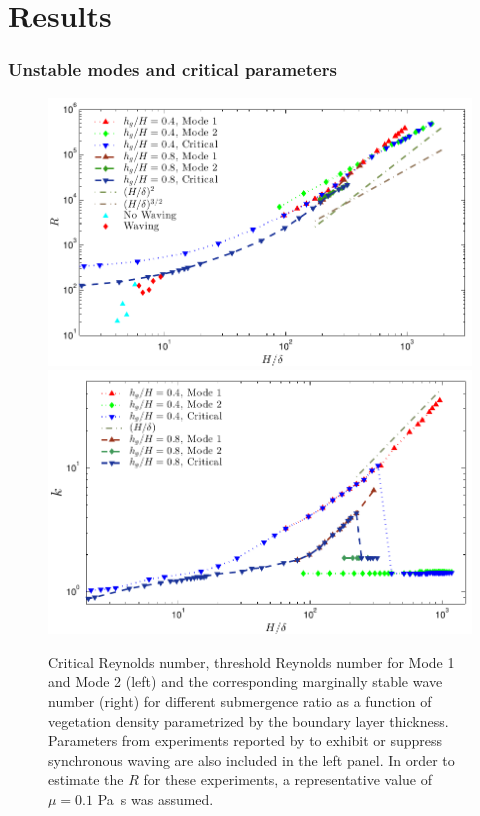 \documentclass[12pt]{report}   %
\newcommand{\Rey}{{R}}
\begin{document}
\chapter{Results}
\subsection{Unstable modes and critical parameters}
\begin{figure}
\begin{center}
\includegraphics[scale = 0.95]{new_graph_R_vs_delta}\\
\includegraphics[scale = 0.95]{new_graph_K_vs_delta}
\end{center}
\caption{
Critical Reynolds number, threshold Reynolds number for Mode 1 and Mode 2 (left) and the corresponding marginally stable wave number (right) for different submergence ratio as a function of vegetation density parametrized by the boundary layer thickness. 
Parameters from experiments reported by \cite{Ghisal02} to exhibit or suppress synchronous waving are also included in the left panel. 
In order to estimate the $\Rey$ for these experiments, a representative value of $\mu=0.1$ Pa~s was assumed.
}
\label{Re_vs_delta}
\end{figure}
\end{document}
